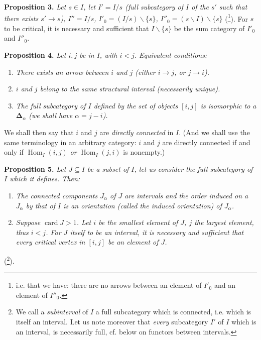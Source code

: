\documentclass[11pt]{article}
\newcommand{\printedpage}[1]{\marginpar{\footnotesize p.~#1}}
\newcommand{\msp}[1]{\marginpar{\footnotesize [#1]}}
\newcommand{\bD}{\boldsymbol{\Delta}}
\begin{document}
\textbf{Proposition 3.} \textit{Let $s \in I$, let $I' = I/s$ (full subcategory of $I$ of the $s'$ such that there exists $s' \longrightarrow s$), $I'' = I/s$, $I'_0 = (I/s)\backslash\{s\}$, $I''_0 = (s\backslash I)\backslash\{s\}$} (\footnote[3]{i.e. that we have: there are no arrows between an element of $I'_0$ and an element of $I''_0$.}). For $s$ to be critical, it is necessary and sufficient that $I\backslash\{s\}$ be the sum category of $I'_0$ and $I''_0$.

\msp{page 11}

\textbf{Proposition 4.} \textit{Let $i,j$ be in $I$, with $i < j$. Equivalent conditions:}
\begin{enumerate}
\item[\textit{a)}] \textit{There exists an arrow between $i$ and $j$ (either $i \longrightarrow j$, or $j \longrightarrow i$).}
\item[\textit{b)}] \textit{$i$ and $j$ belong to the same structural interval (necessarily unique).}
\item[\textit{c)}] \textit{The full subcategory of $I$ defined by the set of objects $[i,j]$ is isomorphic to a $\bD_\alpha$ (we shall have $\alpha = j-i$).}
\end{enumerate}

\printedpage{7}
We shall then say that $i$ and $j$ are \textit{directly connected} in $I$. (And we shall use the same terminology in an arbitrary category: $i$ and $j$ are directly connected if and only if $\operatorname{Hom}_I(i,j)$ \textit{or} $\operatorname{Hom}_I(j,i)$ is nonempty.)

\textbf{Proposition 5.} \textit{Let $J \subseteq I$ be a subset of $I$, let us consider the full subcategory of $I$ which it defines. Then:}
\begin{enumerate}
\item[\textit{a)}] \textit{The connected components $J_\alpha$ of $J$ are intervals and the order induced on a $J_\alpha$ by that of $I$ is an orientation (called the \textup{induced orientation}) of $J_\alpha$.}
\item[\textit{b)}] \textit{Suppose $\operatorname{card} J > 1$. Let $i$ be the smallest element of $J$, $j$ the largest element, thus $i < j$. For $J$ itself to be an interval, it is necessary and sufficient that every critical vertex in $[i,j]$ be an element of $J$.}
\end{enumerate}

(\footnote[4]{We call a \textit{subinterval} of $I$ a full subcategory %
which is connected, i.e. which is itself an interval. Let us note moreover that \textit{every} subcategory $I'$ of $I$ which is an interval, is necessarily full, cf. below on functors between intervals.}).
\end{document}
